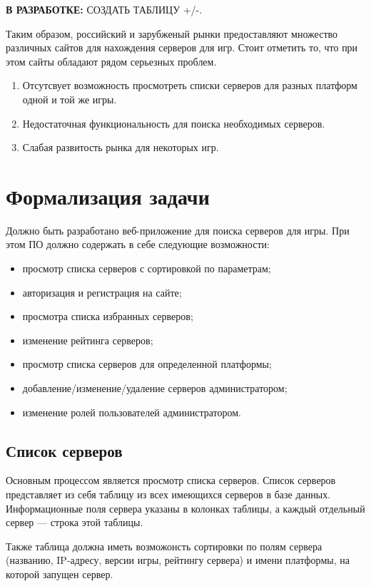 \textbf{В РАЗРАБОТКЕ:} СОЗДАТЬ ТАБЛИЦУ +/-.

Таким образом, российский и зарубженый рынки предоставляют множество различных сайтов для нахождения серверов для игр. Стоит отметить то, что при этом сайты обладают рядом серьезных проблем.

\begin{enumerate}
    \item Отсутсвует возможность просмотреть списки серверов для разных платформ одной и той же игры.
    \item Недостаточная функциональность для поиска необходимых серверов.
    \item Слабая развитость рынка для некоторых игр.
\end{enumerate}


\section{Формализация задачи}

Должно быть разработано веб-приложение для поиска серверов для игры. При этом ПО должно содержать в себе следующие возможности:

\begin{itemize}
    \item просмотр списка серверов с сортировкой по параметрам;
    \item авторизация и регистрация на сайте;
    \item просмотра списка избранных серверов;
    \item изменение рейтинга серверов;
    \item просмотр списка серверов для определенной платформы;
    \item добавление/изменение/удаление серверов администратором;
    \item изменение ролей пользователей администратором.
\end{itemize}

\subsection{Список серверов}

Основным процессом является просмотр списка серверов. Список серверов представляет из себя таблицу из всех имеющихся серверов в базе данных. Информационные поля сервера указаны в колонках таблицы, а каждый отдельный сервер --- строка этой таблицы.

Также таблица должна иметь возможонсть сортировки по полям сервера (названию, IP-адресу, версии игры, рейтингу сервера) и имени платформы, на которой запущен сервер.


